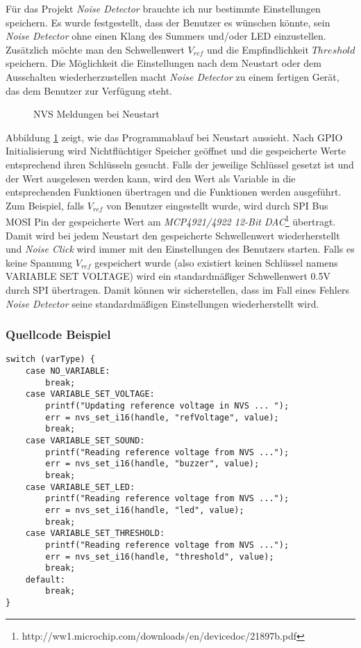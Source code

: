 Für das Projekt \textit{Noise Detector} brauchte ich nur bestimmte Einstellungen speichern. Es wurde festgestellt, dass der Benutzer es wünschen könnte, sein \textit{Noise Detector} ohne einen Klang des Summers und/oder LED einzustellen. Zusätzlich möchte man den Schwellenwert $V_{ref}$ und die Empfindlichkeit $Threshold$ speichern. Die Möglichkeit die Einstellungen nach dem Neustart oder dem Ausschalten wiederherzustellen macht \textit{Noise Detector} zu einem fertigen Gerät, das dem Benutzer zur Verfügung steht. 
\begin{figure}[h]
	\centering
	\caption{NVS Meldungen bei Neustart}
	\label{fig:nvsnvs}
\end{figure}
Abbildung \ref{fig:nvsnvs} zeigt, wie das Programmablauf bei Neustart aussieht. Nach GPIO Initialisierung wird Nichtflüchtiger Speicher geöffnet und die gespeicherte Werte entsprechend ihren Schlüsseln gesucht. Falls der jeweilige Schlüssel gesetzt ist und der Wert ausgelesen werden kann, wird den Wert als Variable in die entsprechenden Funktionen übertragen und die Funktionen werden ausgeführt. Zum Beispiel, falls  $V_{ref}$ von Benutzer eingestellt wurde, wird durch SPI Bus MOSI Pin der gespeicherte Wert am \textit{MCP4921/4922 12-Bit DAC}\footnote{http://ww1.microchip.com/downloads/en/devicedoc/21897b.pdf} übertragt. Damit wird bei jedem Neustart den gespeicherte Schwellenwert wiederherstellt und \textit{Noise Click} wird immer mit den Einstellungen des Benutzers starten. Falls es keine Spannung $V_{ref}$ gespeichert wurde (also existiert keinen Schlüssel namens {VARIABLE SET VOLTAGE}) wird ein standardmäßiger Schwellenwert 0.5V durch SPI übertragen. Damit können wir sicherstellen, dass im Fall eines Fehlers \textit{Noise Detector} seine standardmäßigen Einstellungen wiederherstellt wird. 
\subsubsection{Quellcode Beispiel}
\begin{lstlisting}
switch (varType) {
	case NO_VARIABLE:
		break;
	case VARIABLE_SET_VOLTAGE:
		printf("Updating reference voltage in NVS ... ");
		err = nvs_set_i16(handle, "refVoltage", value);
		break;
	case VARIABLE_SET_SOUND:
		printf("Reading reference voltage from NVS ...");
		err = nvs_set_i16(handle, "buzzer", value);
		break;
	case VARIABLE_SET_LED:
		printf("Reading reference voltage from NVS ...");
		err = nvs_set_i16(handle, "led", value);
		break;
	case VARIABLE_SET_THRESHOLD:
		printf("Reading reference voltage from NVS ...");
		err = nvs_set_i16(handle, "threshold", value);
		break;
	default:
		break;
}
\end{lstlisting}
